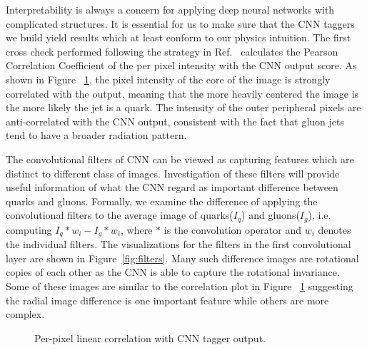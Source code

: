 Interpretability is always a concern for applying deep neural networks
with complicated structures. It is essential for us to make sure that the
CNN taggers we build yield results which at least conform to our physics intuition.
The first cross check performed following the strategy in Ref.~\cite{deOliveira:2015xxd} calculates
the Pearson Correlation Coefficient of the per pixel intensity with the CNN output score.
As shown in Figure ~\ref{fig:correlation}, the pixel intensity of the core of the image is strongly
 correlated with the output, meaning that the more heavily centered the image is the more likely
the jet is a quark. The intensity of the outer peripheral pixels are anti-correlated with
the CNN output, consistent with the fact that gluon jets tend to have a broader radiation pattern. 

The convolutional filters of CNN can be viewed as capturing features which are distinct to different
class of images. Investigation of these filters will provide useful information of what the CNN regard as
important difference between quarks and gluons. Formally, we examine the difference of applying the
convolutional filters to the average image of quarks($I_q$) and gluons($I_g$), i.e. computing $I_q * w_i - I_g * w_i$,
where $*$ is the convolution operator and $w_i$ denotes the individual filters. The visualizations for the
filters in the first convolutional layer are shown in Figure~\ref{fig:filters}.
Many such difference images are rotational copies of each other as the CNN is able to capture the rotational
invariance. Some of these images are similar to the correlation plot in Figure ~\ref{fig:correlation} suggesting
the radial image difference is one important feature while others are more complex. 

\begin{figure}[htbp]
\begin{center}
\caption{
Per-pixel linear correlation with CNN tagger output.
}
\label{fig:correlation}
\end{center}
\end{figure}


